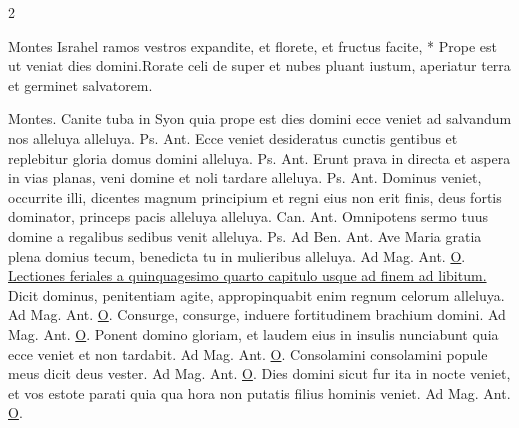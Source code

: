 \begin{multicols*}{2}
\begin{responsory-doxology}
{Montes Israhel ramos vestros expandite, et florete, et fructus facite, * Prope est ut veniat dies domini.}{Rorate celi de super et nubes pluant iustum, aperiatur terra et germinet salvatorem.}
\end{responsory-doxology}%
Montes.
 Canite tuba in Syon quia prope est dies domini ecce veniet ad salvandum nos alleluya alleluya. {\color{Red} Ps.}  {\color{Red} Ant.} Ecce veniet desideratus cunctis gentibus et replebitur gloria domus domini alleluya. {\color{Red} Ps.}  {\color{Red} Ant.} Erunt prava in directa et aspera in vias planas, veni domine et noli tardare alleluya. {\color{Red} Ps.}  {\color{Red} Ant.} Dominus veniet, occurrite illi, dicentes magnum principium et regni eius non erit finis, deus fortis dominator, princeps pacis alleluya alleluya. {\color{Red} Can.}  {\color{Red} Ant.} Omnipotens sermo tuus domine a regalibus sedibus venit alleluya. {\color{Red} Ps.}  {\color{Red} Ad Ben. Ant.} Ave Maria gratia plena domius tecum, benedicta tu in mulieribus alleluya. {\color{Red} Ad Mag. Ant.} \hyperlink{o-antiphons}{O}.
\newline \ul{Lectiones feriales a quinquagesimo quarto capitulo usque ad finem ad libitum.}
 \hypertarget{ant-dicit-dominus}{Dicit} dominus, penitentiam agite, appropinquabit enim regnum celorum alleluya. {\color{Red} Ad Mag. Ant.} \hyperlink{o-antiphons}{O}.
 Consurge, consurge, induere fortitudinem brachium domini. {\color{Red} Ad Mag. Ant.} \hyperlink{o-antiphons}{O}.
 Ponent domino gloriam, et laudem eius in insulis nunciabunt quia ecce veniet et non tardabit. {\color{Red} Ad Mag. Ant.} \hyperlink{o-antiphons}{O}.
 Consolamini consolamini popule meus dicit deus vester. {\color{Red} Ad Mag. Ant.} \hyperlink{o-antiphons}{O}.
 Dies domini sicut fur ita in nocte veniet, et vos estote parati quia qua hora non putatis filius hominis veniet. {\color{Red} Ad Mag. Ant.} \hyperlink{o-antiphons}{O}.
{\color{Red} }

\end{multicols*}
